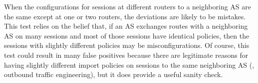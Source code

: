 When the configurations for sessions at different routers to a
neighboring AS are the same except at one or two routers, the deviations
are likely to be mistakes.  This test relies on the belief that, if an
AS exchanges routes with a neighboring AS on many sessions and most of
those sessions have identical policies, then the sessions with slightly
different policies may be misconfigurations.  Of course, this test could
result in many false positives because there are legitimate reasons for
having slightly different import policies on sessions to the same
neighboring AS (\eg, outbound traffic engineering), but it does provide
a useful sanity check.


